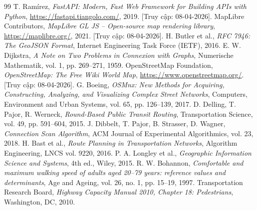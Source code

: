 ﻿\documentclass[../DoAn.tex]{subfiles}
\begin{document}
\newpage
\renewcommand\bibname{TÀI LIỆU THAM KHẢO}
\begin{thebibliography}{99}
     T. Ramírez, \textit{FastAPI: Modern, Fast Web Framework for Building APIs with Python}, \url{https://fastapi.tiangolo.com/}, 2019. [Truy cập: 08-04-2026].
     MapLibre Contributors, \textit{MapLibre GL JS -- Open-source map rendering library}, \url{https://maplibre.org/}, 2021. [Truy cập: 08-04-2026].
     H. Butler et al., \textit{RFC 7946: The GeoJSON Format}, Internet Engineering Task Force (IETF), 2016.
     E. W. Dijkstra, \textit{A Note on Two Problems in Connexion with Graphs}, Numerische Mathematik, vol. 1, pp. 269--271, 1959.
     OpenStreetMap Foundation, \textit{OpenStreetMap: The Free Wiki World Map}, \url{https://www.openstreetmap.org/}. [Truy cập: 08-04-2026].
     G. Boeing, \textit{OSMnx: New Methods for Acquiring, Constructing, Analyzing, and Visualizing Complex Street Networks}, Computers, Environment and Urban Systems, vol. 65, pp. 126--139, 2017.
     D. Delling, T. Pajor, R. Werneck, \textit{Round-Based Public Transit Routing}, Transportation Science, vol. 49, pp. 591--604, 2015.
     J. Dibbelt, T. Pajor, B. Strasser, D. Wagner, \textit{Connection Scan Algorithm}, ACM Journal of Experimental Algorithmics, vol. 23, 2018.
     H. Bast et al., \textit{Route Planning in Transportation Networks}, Algorithm Engineering, LNCS vol. 9220, 2016.
     P. A. Longley et al., \textit{Geographic Information Science and Systems}, 4th ed., Wiley, 2015.
     R. W. Bohannon, \textit{Comfortable and maximum walking speed of adults aged 20--79 years: reference values and determinants}, Age and Ageing, vol. 26, no. 1, pp. 15--19, 1997.
     Transportation Research Board, \textit{Highway Capacity Manual 2010, Chapter 18: Pedestrians}, Washington, DC, 2010.
\end{thebibliography}
\end{document}
